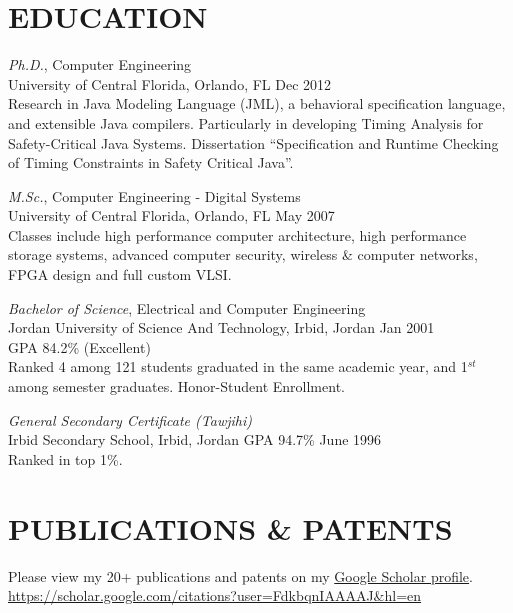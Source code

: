 \documentclass[line,margin]{res}
\begin{document}
\begin{resume}
\section{EDUCATION}
{\sl Ph.D.}, Computer Engineering \\
University of Central Florida, Orlando, FL \hfill
Dec 2012 \vspace{0.05in} \\
Research in Java Modeling Language (JML), a behavioral specification language,
and extensible Java compilers. Particularly in developing Timing Analysis
for Safety-Critical Java Systems. Dissertation ``Specification and Runtime
Checking of Timing Constraints in Safety Critical Java''.

{\sl M.Sc.}, Computer Engineering - Digital Systems \\
University of Central Florida, Orlando, FL \hspace{0.2in}  \hfill
May 2007 \vspace{0.05in} \\
Classes include high performance computer architecture, high performance
storage systems, advanced computer security, wireless \& computer networks, FPGA
design and full custom VLSI.

{\sl Bachelor of Science}, Electrical and Computer Engineering \\
Jordan University of Science And Technology, Irbid, Jordan       \hfill    Jan
2001 \vspace{0.05in} \\
GPA 84.2\% (Excellent) \\
Ranked 4 among 121 students graduated in the same academic year, and 1$^{st}$
among semester graduates. Honor-Student Enrollment.

{\sl General Secondary Certificate (Tawjihi)} \\
Irbid Secondary School, Irbid, Jordan \hspace{0.2in}  GPA 94.7\% \hfill
June 1996 \vspace{0.05in} \\
Ranked in top 1\%.

\section{PUBLICATIONS \& PATENTS}
Please view my 20+ publications and patents on my
\href{https://scholar.google.com/citations?user=FdkbqnIAAAAJ&hl=en}{Google Scholar profile}.\\
\url{https://scholar.google.com/citations?user=FdkbqnIAAAAJ&hl=en}

\end{resume}
\end{document}
